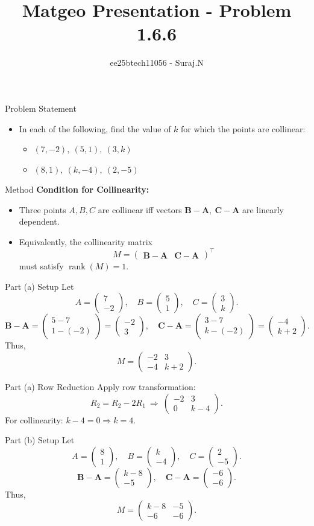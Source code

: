 \documentclass{beamer}
\title{Matgeo Presentation - Problem 1.6.6}
\author{ee25btech11056 - Suraj.N}
\numberwithin{equation}{section}
\theoremstyle{remark}
\newcommand{\myvec}[1]{\ensuremath{\begin{pmatrix}#1\end{pmatrix}}}
\let\vec\mathbf
\begin{document}
\begin{frame}
  \titlepage
\end{frame}

\begin{frame}{Problem Statement}
\begin{itemize}
  \item In each of the following, find the value of $k$ for which the points are collinear:
  \begin{itemize}
  \item $(7,-2),\ (5,1),\ (3,k)$
  \item $(8,1),\ (k,-4),\ (2,-5)$
  \end{itemize}
\end{itemize}
\end{frame}

\begin{frame}{Method}
\textbf{Condition for Collinearity:}
\begin{itemize}
\item Three points $A,B,C$ are collinear iff vectors $\vec{B}-\vec{A},\ \vec{C}-\vec{A}$ are linearly dependent.
\item Equivalently, the collinearity matrix
\[
  M = \myvec{ \vec{B}-\vec{A} & \vec{C}-\vec{A} }^\top
\]
must satisfy $\operatorname{rank}(M)=1$.
\end{itemize}
\end{frame}

\begin{frame}{Part (a) Setup}
Let
\[
A=\myvec{7\\-2}, \quad B=\myvec{5\\1}, \quad C=\myvec{3\\k}.
\]
\[
\vec{B}-\vec{A} = \myvec{5-7\\ 1-(-2)} = \myvec{-2\\3},\quad
\vec{C}-\vec{A} = \myvec{3-7\\ k-(-2)} = \myvec{-4\\k+2}.
\]
Thus,
\[
M = \myvec{-2 & 3\\ -4 & k+2}.
\]
\end{frame}

\begin{frame}{Part (a) Row Reduction}
Apply row transformation:
\[
R_2 = R_2 - 2R_1 \ \Rightarrow\
\myvec{-2 & 3\\ 0 & k-4}.
\]
For collinearity: $k-4=0 \Rightarrow k=\boxed{4}$.
\end{frame}

\begin{frame}{Part (b) Setup}
Let
\[
A=\myvec{8\\1}, \quad B=\myvec{k\\-4}, \quad C=\myvec{2\\-5}.
\]
\[
\vec{B}-\vec{A} = \myvec{k-8\\ -5}, \quad
\vec{C}-\vec{A} = \myvec{-6\\ -6}.
\]
Thus,
\[
M = \myvec{k-8 & -5\\ -6 & -6}.
\]
\end{frame}
\end{document}
